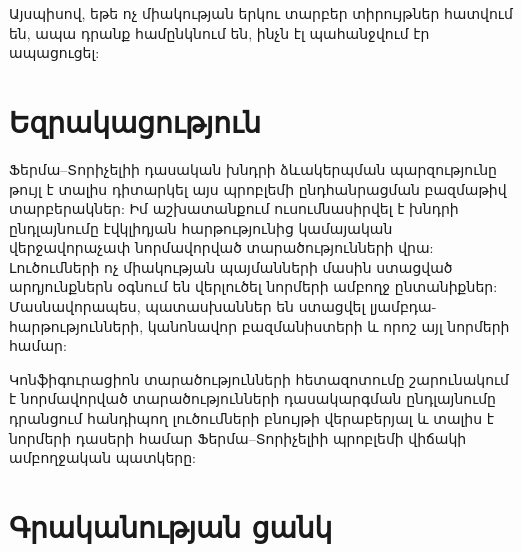\documentclass[12pt,a4paper]{article}
\numberwithin{equation}{section}
\numberwithin{figure}{section}
\begin{document}
Այսպիսով, եթե ոչ միակության երկու տարբեր տիրույթներ հատվում են, ապա դրանք համընկնում են, ինչն էլ պահանջվում էր ապացուցել: 

\section{Եզրակացություն}

Ֆերմա--Տորիչելիի դասական խնդրի ձևակերպման պարզությունը թույլ է տալիս դիտարկել այս պրոբլեմի ընդհանրացման բազմաթիվ տարբերակներ: Իմ աշխատանքում ուսումնասիրվել է խնդրի ընդլայնումը էվկլիդյան հարթությունից կամայական վերջավորաչափ նորմավորված տարածությունների վրա: Լուծումների ոչ միակության պայմանների մասին ստացված արդյունքներն օգնում են վերլուծել նորմերի ամբողջ ընտանիքներ: Մասնավորապես, պատասխաններ են ստացվել լյամբդա-հարթությունների, կանոնավոր բազմանիստերի և որոշ այլ նորմերի համար:

Կոնֆիգուրացիոն տարածությունների հետազոտումը շարունակում է նորմավորված տարածությունների դասակարգման ընդլայնումը դրանցում հանդիպող լուծումների բնույթի վերաբերյալ և տալիս է նորմերի դասերի համար Ֆերմա--Տորիչելիի պրոբլեմի վիճակի ամբողջական պատկերը:
\newpage
\section*{Գրականության ցանկ}
\end{document}
